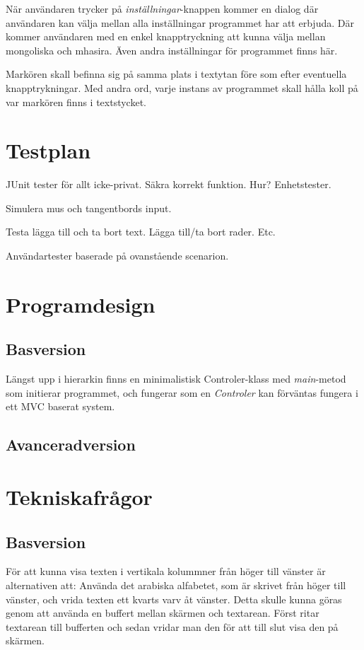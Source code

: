 \documentclass[a4paper,11p,twoside]{report}
\begin{document}
När användaren trycker på \emph{inställningar}-knappen kommer en dialog där användaren kan välja mellan alla inställningar programmet har att erbjuda. Där kommer användaren med en enkel knapptryckning att kunna välja mellan mongoliska och mhasira. Även andra inställningar för programmet finns här.

Markören skall befinna sig på samma plats i textytan före som efter eventuella knapptrykningar. Med andra ord, varje instans av programmet skall hålla koll på var markören finns i textstycket.

\section{Testplan}
JUnit tester för allt icke-privat. Säkra korrekt funktion. Hur? Enhetstester.

Simulera mus och tangentbords input.

Testa lägga till och ta bort text. Lägga till/ta bort rader. Etc.

Användartester baserade på ovanstående scenarion.

\section{Programdesign}
\subsection{Basversion}
Längst upp i hierarkin finns en minimalistisk Controler-klass med \emph{main}-metod som initierar programmet, och fungerar som en \emph{Controler} kan förväntas fungera i ett MVC baserat system.


\subsection{Avanceradversion}

\section{Tekniskafrågor}
\subsection{Basversion}
För att kunna visa texten i vertikala kolummner från höger till vänster är alternativen att:
Använda det arabiska alfabetet, som är skrivet från höger till vänster, och vrida texten ett kvarts varv åt vänster. Detta skulle kunna göras genom att använda en buffert mellan skärmen och textarean. Först ritar textarean till bufferten och sedan vridar man den för att till slut visa den på skärmen.
\end{document}
